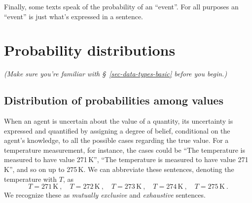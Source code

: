 \documentclass[
  a4paper,
  DIV=11,
  numbers=noendperiod,
  oneside]{scrreprt}
\begin{document}
Finally, some texts speak of the probability of an ``event''. For all
purposes an ``event'' is just what's expressed in a sentence.

\hypertarget{probability-distributions}{%
\chapter{Probability distributions}\label{probability-distributions}}

\providecommand{\ul}{\uline}
\renewcommand*{\|}[1][]{\nonscript\:#1\vert\nonscript\:\mathopen{}}
\providecommand*{\pr}[1]{\textsf{\small`#1'}}
\renewcommand*{\pr}[1]{\textsf{\small`#1'}}
\providecommand*{\prq}[1]{\textsf{\small #1}}

\providecommand{\se}[1]{\mathsfit{#1}}
\renewcommand{\se}[1]{\mathsfit{#1}}
\providecommand{\p}{\mathrm{p}}
\renewcommand{\p}{\mathrm{p}}
\renewcommand{\P}{\mathrm{P}}

\providecommand*{\mo}[1][=]{\mathord{\,#1\,}}
\providecommand*{\yX}{\se{X}}
\providecommand*{\yY}{\se{Y}}
\providecommand*{\yI}{\se{I}}
\providecommand*{\yi}[1][]{\se{I}_{\text{#1}}}
\providecommand{\di}{\mathrm{d}}

{\emph{(Make sure you're familiar with §~\ref{sec-data-types-basic}
before you begin.)}}

\hypertarget{distribution-of-probabilities-among-values}{%
\section{Distribution of probabilities among
values}\label{distribution-of-probabilities-among-values}}

When an agent is uncertain about the value of a quantity, its
uncertainty is expressed and quantified by assigning a degree of belief,
conditional on the agent's knowledge, to all the possible cases
regarding the true value. For a temperature measurement, for instance,
the cases could be ``{The temperature is measured to have value
271\,K}'', ``{The temperature is measured to have value 271\,K}'', and
so on up to 275\,K. We can abbreviate these sentences, denoting the
temperature with \(T\), as \[
T = 271\,\mathrm{K} \ , \quad
T = 272\,\mathrm{K} \ , \quad
T = 273\,\mathrm{K} \ , \quad
T = 274\,\mathrm{K} \ , \quad
T = 275\,\mathrm{K} \ .
\] We recognize these as \emph{mutually exclusive} and \emph{exhaustive}
sentences.
\end{document}
